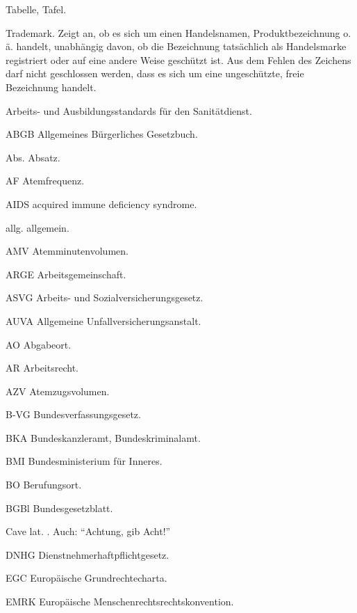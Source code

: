 \documentclass[
ngerman,
paper=a4,
asymmetric,
fontsize=9pt,
headings=small,
draft=false,
parskip=false,
footnotes=multiple,
]{scrbook}
\begin{document}
\begin{gWideParEnv}
\begin{multicols}{3}
{\small
\begin{compactdesc}
  \item[\SignTable] Tabelle, Tafel.
  \item[{\texttrademark}] Trademark. Zeigt an, ob es sich um einen Handelsnamen,
  Produktbezeichnung o.\,ä. handelt, unabhängig davon, ob die Bezeichnung
  tatsächlich als Handelsmarke registriert oder auf eine andere Weise
  geschützt ist. Aus dem Fehlen des Zeichens darf nicht geschlossen werden, dass
  es sich um eine ungeschützte, freie Bezeichnung handelt. 
  \item[\AASS] Arbeits- und Ausbildungsstandards für den Sanitätdienst. 
    \item[ABGB]  Allgemeines Bürgerliches Gesetzbuch. 
    \item[Abs.] Absatz. 
    \item[AF] Atemfrequenz.
    \item[AIDS]  acquired immune deficiency syndrome. 
    \item[allg.] allgemein. 
    \item[AMV] Atemminutenvolumen. 
    \item[ARGE] Arbeitsgemeinschaft. 
    \item[ASVG] Arbeits- und Sozialversicherungsgesetz. 
    \item[AUVA] Allgemeine Unfallversicherungsanstalt. 
    \item[AO]  Abgabeort. 
    \item[AR]  Arbeitsrecht. 
    \item[AZV] Atemzugsvolumen. 
    \item[B-VG] Bundesverfassungsgesetz. 
    \item[BKA] Bundeskanzleramt, Bundeskriminalamt. 
    \item[BMI] Bundesministerium für Inneres. 
    \item[BO]  Berufungsort. 
    \item[BGBl] Bundesgesetzblatt. 
    \item[Cave] {\flq}lat.{\frq} . Auch:
    "`Achtung, gib Acht!"'
    \item[DNHG]  Dienstnehmerhaftpflichtgesetz. 
    \item[EGC] Europäische Grundrechtecharta. 
    \item[EMRK] Europäische Menschenrechtsrechtskonvention. 

\end{compactdesc}}
\end{multicols}
\end{gWideParEnv}
\end{document}
